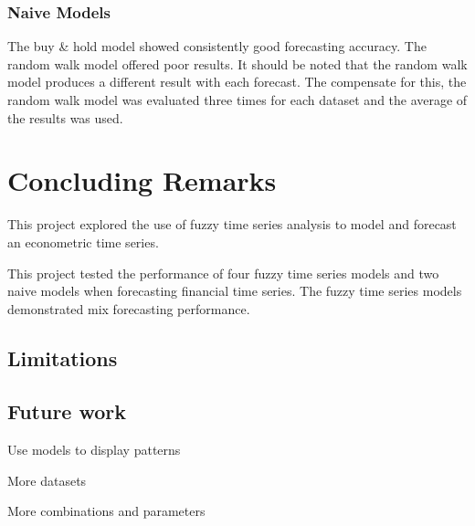 \documentclass[12pt, oneside, a4paper]{article}
\theoremstyle{definition}
\begin{document}
\subsubsection{Naive Models}

The buy \& hold model showed consistently good forecasting accuracy. The random walk model offered poor results. It should be noted that the random walk model produces a different result with each forecast. The compensate for this, the random walk model was evaluated three times for each dataset and the average of the results was used.

\section{Concluding Remarks}

This project explored the use of fuzzy time series analysis to model and forecast an econometric time series. 

This project tested the performance of four fuzzy time series models and two naive models when forecasting financial time series. The fuzzy time series models demonstrated mix forecasting performance. 

\subsection{Limitations}

\subsection{Future work}

Use models to display patterns

More datasets

More combinations and parameters
\end{document}
